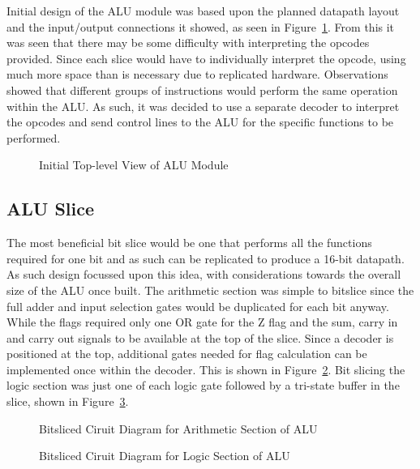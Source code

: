 Initial design of the ALU module was based upon the planned datapath layout and the input/output connections it showed, as seen in Figure~\ref{fig:BasicALUSym}. From this it was seen that there may be some difficulty with interpreting the opcodes provided. Since each slice would have to individually interpret the opcode, using much more space than is necessary due to replicated hardware. Observations showed that different groups of instructions would perform the same operation within the ALU. As such, it was decided to use a separate decoder to interpret the opcodes and send control lines to the ALU for the specific functions to be performed. 

\begin{figure}[h]
	\caption{Initial Top-level View of ALU Module}
	\label{fig:BasicALUSym}
\end{figure}

\subsection{ALU Slice}
The most beneficial bit slice would be one that performs all the functions required for one bit and as such can be replicated to produce a 16-bit datapath. As such design focussed upon this idea, with considerations towards the overall size of the ALU once built. The arithmetic section was simple to bitslice since the full adder and input selection gates would be duplicated for each bit anyway. While the flags required only one OR gate for the Z flag and the sum, carry in and carry out signals to be available at the top of the slice. Since a decoder is positioned at the top, additional gates needed for flag calculation can be implemented once within the decoder. This is shown in Figure~\ref{fig:ArithSlice}. Bit slicing the logic section was just one of each logic gate followed by a tri-state buffer in the slice, shown in Figure~\ref{fig:LogicSlice}. 

\begin{figure}[h]
	\caption{Bitsliced Ciruit Diagram for Arithmetic Section of ALU}
	\label{fig:ArithSlice}
\end{figure}

\begin{figure}[h]
	\caption{Bitsliced Ciruit Diagram for Logic Section of ALU}
	\label{fig:LogicSlice}
\end{figure}

